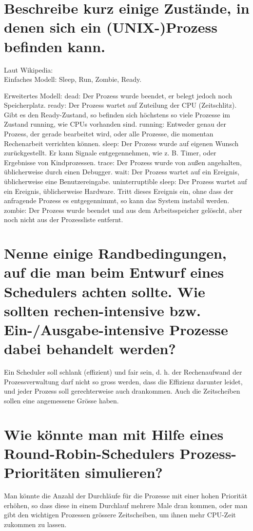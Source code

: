 \documentclass[12pt,a4paper,ngerman]{scrartcl}
\newcommand{\question}[1]{#1}
\newenvironment {answer}
                {}
                {}
\begin{document}
\section{\question{Beschreibe kurz einige Zustände, in denen sich ein (UNIX-)Prozess befinden kann.}}
\begin{answer}
Laut Wikipedia:\\
Einfaches Modell:
Sleep, Run, Zombie, Ready.

Erweitertes Modell:
dead: Der Prozess wurde beendet, er belegt jedoch noch Speicherplatz.
ready: Der Prozess wartet auf Zuteilung der CPU (Zeitschlitz). Gibt es den Ready-Zustand, so befinden sich höchstens so viele Prozesse im Zustand running, wie CPUs vorhanden sind.
running: Entweder genau der Prozess, der gerade bearbeitet wird, oder alle Prozesse, die momentan Rechenarbeit verrichten können.
sleep: Der Prozess wurde auf eigenen Wunsch zurückgestellt. Er kann Signale entgegennehmen, wie z. B. Timer, oder Ergebnisse von Kindprozessen.
trace: Der Prozess wurde von außen angehalten, üblicherweise durch einen Debugger.
wait: Der Prozess wartet auf ein Ereignis, üblicherweise eine Benutzereingabe.
uninterruptible sleep: Der Prozess wartet auf ein Ereignis, üblicherweise Hardware. Tritt dieses Ereignis ein, ohne dass der anfragende Prozess es entgegennimmt, so kann das System instabil werden.
zombie: Der Prozess wurde beendet und aus dem Arbeitsspeicher gelöscht, aber noch nicht aus der Prozessliste entfernt.
\end{answer}

\section{\question{Nenne einige Randbedingungen, auf die man beim Entwurf eines Schedulers achten sollte. Wie sollten rechen-intensive bzw. Ein-/Ausgabe-intensive Prozesse dabei behandelt werden?}}
\begin{answer}
Ein Scheduler soll schlank (effizient) und fair sein, d. h. der Rechenaufwand der Prozessverwaltung
darf nicht so gross werden, dass die Effizienz darunter leidet, und jeder Prozess soll
gerechterweise auch drankommen. Auch die Zeitscheiben sollen eine angemessene Grösse
haben.
\end{answer}

\section{\question{Wie könnte man mit Hilfe eines Round-Robin-Schedulers Prozess-Prioritäten simulieren?}}
\begin{answer}
Man könnte die Anzahl der Durchläufe für die Prozesse mit einer hohen Priorität erhöhen,
so dass diese in einem Durchlauf mehrere Male dran kommen, oder man gibt den wichtigen
Prozessen grössere Zeitscheiben, um ihnen mehr CPU-Zeit zukommen zu lassen.
\end{answer}
\end{document}
